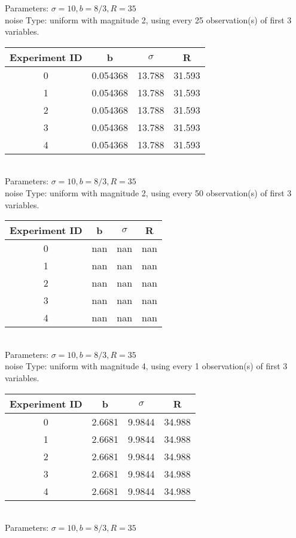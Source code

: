 \begin{multicols}{3}
Parameters: $\sigma=10, b=8/3, R=35$\\
noise Type: uniform with magnitude 2, using every 25 observation(s) of first 3 variables.\\
\begin{tabular}{cccc}
\hline Experiment ID & b & $\sigma$ & R \\ \hline 
0 & 0.054368 & 13.788 & 31.593\\ \hline 
 1 & 0.054368 & 13.788 & 31.593\\ \hline 
 2 & 0.054368 & 13.788 & 31.593\\ \hline 
 3 & 0.054368 & 13.788 & 31.593\\ \hline 
 4 & 0.054368 & 13.788 & 31.593\\ \hline 
 \end{tabular}\\
Parameters: $\sigma=10, b=8/3, R=35$\\
noise Type: uniform with magnitude 2, using every 50 observation(s) of first 3 variables.\\
\begin{tabular}{cccc}
\hline Experiment ID & b & $\sigma$ & R \\ \hline 
0 & nan & nan & nan\\ \hline 
 1 & nan & nan & nan\\ \hline 
 2 & nan & nan & nan\\ \hline 
 3 & nan & nan & nan\\ \hline 
 4 & nan & nan & nan\\ \hline 
 \end{tabular}\\
Parameters: $\sigma=10, b=8/3, R=35$\\
noise Type: uniform with magnitude 4, using every 1 observation(s) of first 3 variables.\\
\begin{tabular}{cccc}
\hline Experiment ID & b & $\sigma$ & R \\ \hline 
0 & 2.6681 & 9.9844 & 34.988\\ \hline 
 1 & 2.6681 & 9.9844 & 34.988\\ \hline 
 2 & 2.6681 & 9.9844 & 34.988\\ \hline 
 3 & 2.6681 & 9.9844 & 34.988\\ \hline 
 4 & 2.6681 & 9.9844 & 34.988\\ \hline 
 \end{tabular}\\
Parameters: $\sigma=10, b=8/3, R=35$\\

\end{multicols}

